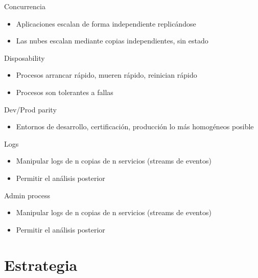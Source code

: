 \documentclass[aspectratio=169]{beamer}
\begin{document}
\begin{frame}{Concurrencia}
\begin{itemize}
	\item Aplicaciones escalan de forma independiente replicándose
	\item Las nubes escalan mediante copias independientes, sin estado
\end{itemize}
\end{frame}

\begin{frame}{Disposability}
\begin{itemize}
	\item Procesos arrancar rápido, mueren rápido, reinician rápido
	\item Procesos son tolerantes a fallas
\end{itemize}

\end{frame}

\begin{frame}{Dev/Prod parity}
\begin{itemize}
	\item Entornos de desarrollo, certificación, producción lo más homogéneos posible
\end{itemize}
\end{frame}

\begin{frame}{Logs}
\begin{itemize}
	\item Manipular logs de n copias de n servicios (streams de eventos)
	\item Permitir el análisis posterior
\end{itemize}
\end{frame}

\begin{frame}{Admin process}
\begin{itemize}
	\item Manipular logs de n copias de n servicios (streams de eventos)
	\item Permitir el análisis posterior
\end{itemize}
\end{frame}
{
    \section{Estrategia}
}
\end{document}
